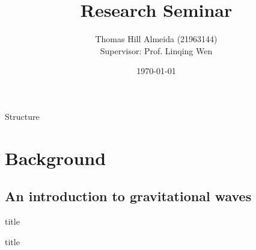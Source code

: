 \documentclass{beamer}
\title{Research Seminar}
\author{Thomas Hill Almeida (21963144)\\
\small{Supervisor: Prof. Linqing Wen}
}
\institute{University of Western Australia \textemdash{} OzGrav}
\date{\today{}}
\begin{document}
\begin{frame}
    \maketitle
\end{frame}

\begin{frame}{Structure}
    \tableofcontents{}
\end{frame}

\section{Background}
\subsection{An introduction to gravitational waves}
\begin{frame}
  \vfill
  \centering
  \begin{beamercolorbox}[sep=8pt,center,shadow=true,rounded=true]{title}
    \insertsectionhead\par%
  \end{beamercolorbox}
  \vfill
\end{frame}
\begin{frame}
  \vfill
  \centering
  \begin{beamercolorbox}[sep=8pt,center,shadow=true,rounded=true]{title}
    \insertsubsectionhead\par%
  \end{beamercolorbox}
  \vfill
\end{frame}

\begin{frame}
\end{frame}
\end{document}
